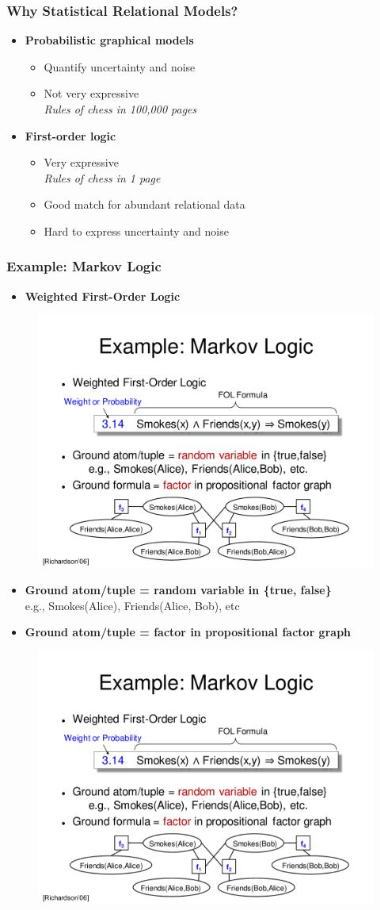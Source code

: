 \documentclass{beamer}
\newcommand{\bi}{\begin{itemize}}
\newcommand{\ei}{\end{itemize}}
\newcommand{\ii}{\item}
\newcommand*{\myblue}[1]{\textcolor{myblue}{#1}}
\newcommand*{\myred}[1]{\textcolor{myred}{#1}}
\begin{document}
\begin{frame}
\frametitle{Why Statistical Relational Models?}
\bi
\ii \textbf{Probabilistic graphical models}
\bi
\ii Quantify uncertainty and noise
\ii Not very expressive\\
\textit{Rules of chess in 100,000 pages}
\ei
\ei
\bi
\ii \textbf{First-order logic}
\bi
\ii Very expressive\\
\textit{Rules of chess in 1 page}
\ii Good match for abundant relational data
\ii Hard to express uncertainty and noise
\ei
\ei
\end{frame}

\begin{frame}
\frametitle{Example: Markov Logic}
\bi
\ii \textbf{Weighted First-Order Logic}
\ei
\begin{figure}[h]
\centering\includegraphics[width=0.75\linewidth]{probability.pdf}
\end{figure}

\bi
\ii \textbf{Ground atom/tuple = \myblue{random variable} in \{true, false\}}\\
e.g., Smokes(Alice), Friends(Alice, Bob), etc
\ii \textbf{Ground atom/tuple = \myred{factor} in propositional factor graph}
\ei

\begin{figure}[h]
\centering\includegraphics[width=0.75\linewidth]{richardson.pdf}
\end{figure}

\end{frame}
\end{document}
